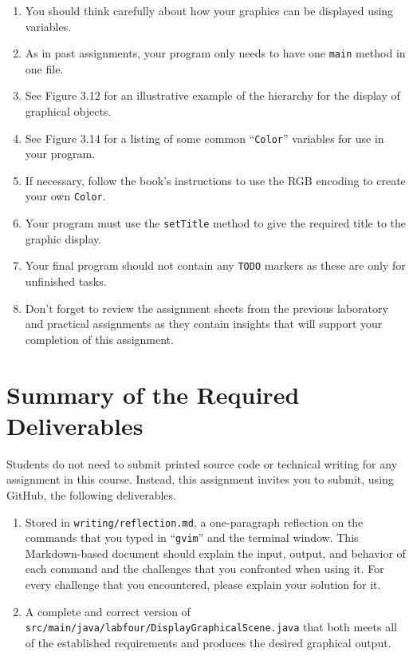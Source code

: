 \documentclass[11pt]{article}
\newcommand{\mainprogramsource}{\lstinline{src/main/java/labfour/DisplayGraphicalScene.java}}
\newcommand{\reflection}{\lstinline{writing/reflection.md}}
\newcommand{\command}[1]{``\lstinline{#1}''}
\newcommand{\program}[1]{\lstinline{#1}}
\begin{document}
\begin{enumerate}
  \setlength{\itemsep}{0pt}

\item You should think carefully about how your graphics can be displayed using
  variables.

\item As in past assignments, your program only needs to have one {\tt main}
  method in one file.

\item See Figure 3.12 for an illustrative example of the hierarchy for the
  display of graphical objects.

\item See Figure 3.14 for a listing of some common \command{Color} variables for
  use in your program.

\item If necessary, follow the book's instructions to use the RGB encoding to
  create your own \program{Color}.

\item Your program must use the \program{setTitle} method to give the required
  title to the graphic display.

\item Your final program should not contain any \program{TODO} markers as these
  are only for unfinished tasks.

\item Don't forget to review the assignment sheets from the previous laboratory
  and practical assignments as they contain insights that will support your
  completion of this assignment.

\end{enumerate}

\section*{Summary of the Required Deliverables}

\noindent Students do not need to submit printed source code or technical
writing for any assignment in this course. Instead, this assignment invites you
to submit, using GitHub, the following deliverables.

\begin{enumerate}

  \setlength{\itemsep}{0in}

\item Stored in \reflection{}, a one-paragraph reflection on the commands that
  you typed in \command{gvim} and the terminal window. This Markdown-based
  document should explain the input, output, and behavior of each command and
  the challenges that you confronted when using it. For every challenge that you
  encountered, please explain your solution for it.

\item A complete and correct version of \mainprogramsource{} that both meets all
  of the established requirements and produces the desired graphical output.

\end{enumerate}
\end{document}
